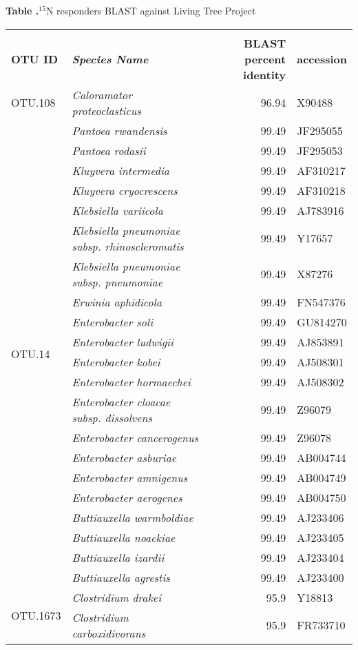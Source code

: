 \begin{table}[ht]

\textbf{\label{tab:LTP_blast} Table
.}{$^{15}$N responders BLAST against Living Tree Project}

{\small\begin{tabular}{l>{\itshape}lrl}
    \toprule \\
    \textbf{OTU ID} & \textbf{Species Name} & \textbf{BLAST percent identity} & \textbf{accession} \\
    \midrule
    \multirow{1}{*}{OTU.108} & Caloramator proteoclasticus & 96.94 & X90488 \\ \midrule
\multirow{21}{*}{OTU.14} & Pantoea rwandensis & 99.49 & JF295055 \\  & Pantoea rodasii & 99.49 & JF295053 \\  & Kluyvera intermedia & 99.49 & AF310217 \\  & Kluyvera cryocrescens & 99.49 & AF310218 \\  & Klebsiella variicola & 99.49 & AJ783916 \\  & Klebsiella pneumoniae subsp. rhinoscleromatis & 99.49 & Y17657 \\  & Klebsiella pneumoniae subsp. pneumoniae & 99.49 & X87276 \\  & Erwinia aphidicola & 99.49 & FN547376 \\  & Enterobacter soli & 99.49 & GU814270 \\  & Enterobacter ludwigii & 99.49 & AJ853891 \\  & Enterobacter kobei & 99.49 & AJ508301 \\  & Enterobacter hormaechei & 99.49 & AJ508302 \\  & Enterobacter cloacae subsp. dissolvens & 99.49 & Z96079 \\  & Enterobacter cancerogenus & 99.49 & Z96078 \\  & Enterobacter asburiae & 99.49 & AB004744 \\  & Enterobacter amnigenus & 99.49 & AB004749 \\  & Enterobacter aerogenes & 99.49 & AB004750 \\  & Buttiauxella warmboldiae & 99.49 & AJ233406 \\  & Buttiauxella noackiae & 99.49 & AJ233405 \\  & Buttiauxella izardii & 99.49 & AJ233404 \\  & Buttiauxella agrestis & 99.49 & AJ233400 \\ \midrule
\multirow{2}{*}{OTU.1673} & Clostridium drakei & 95.9 & Y18813 \\  & Clostridium carboxidivorans & 95.9 & FR733710 \\ \midrule

\end{tabular}}
\end{table}
